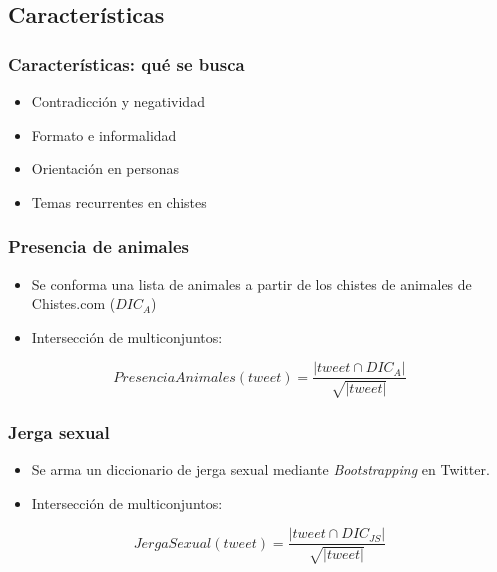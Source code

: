 \subsection{Características}

\begin{frame}
    \frametitle{Características: qué se busca}

    \begin{itemize}
        \item Contradicción y negatividad
        \item Formato e informalidad
        \item Orientación en personas
        \item Temas recurrentes en chistes
    \end{itemize}
\end{frame}

\begin{frame}
    \frametitle{Presencia de animales}

    \begin{itemize}
        \item Se conforma una lista de animales a partir de los chistes de animales de Chistes.com ($DIC_A$)
        \item Intersección de multiconjuntos:
    \end{itemize}

    \begin{center}
        \[
            PresenciaAnimales(tweet) = \frac{|tweet \cap DIC_A|}{\sqrt{|tweet|}}
        \]
    \end{center}
\end{frame}

\begin{frame}
    \frametitle{Jerga sexual}

    \begin{itemize}
        \item Se arma un diccionario de jerga sexual mediante \emph{Bootstrapping} en Twitter.
        \item Intersección de multiconjuntos:
    \end{itemize}

    \begin{center}
        \[
            JergaSexual(tweet) = \frac{|tweet \cap DIC_{JS}|}{\sqrt{|tweet|}}
        \]
    \end{center}
\end{frame}

